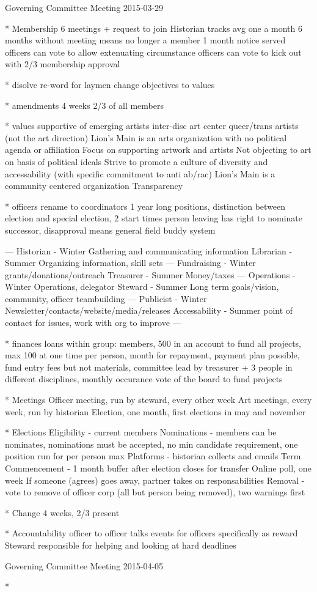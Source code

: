 Governing Committee Meeting 2015-03-29

* Membership
6 meetings + request to join
Historian tracks
avg one a month
6 months without meeting means no longer a member
1 month notice served
officers can vote to allow extenuating circumstance
officers can vote to kick out with 2/3 membership approval

* disolve
re-word for laymen
change objectives to values

* amendments
4 weeks
2/3 of all members

* values
supportive of emerging artists
inter-disc art
center queer/trans artists (not the art direction)
Lion's Main is an arts organization with no political agenda or affiliation
Focus on supporting artwork and artists
Not objecting to art on basis of political ideals
Strive to promote a culture of diversity and accessability (with specific commitment to anti ab/rac)
Lion's Main is a community centered organization
Transparency

* officers
rename to coordinators
1 year long positions, distinction between election and special election, 2 start times
person leaving has right to nominate successor, disapproval means general field
buddy system

---
Historian - Winter
  Gathering and communicating information
Librarian - Summer
  Organizing information, skill sets
---
Fundraising - Winter
  grants/donations/outreach
Treasurer - Summer
  Money/taxes
---
Operations - Winter
  Operations, delegator
Steward - Summer
  Long term goals/vision, community, officer teambuilding
---
Publicist - Winter
  Newsletter/contacts/website/media/releases
Accessability - Summer
  point of contact for issues, work with org to improve
---

* finances
loans within group: members, 500 in an account to fund all projects, max 100 at one time per person, month for repayment, payment plan possible, fund entry fees but not materials, committee lead by treasurer + 3 people in different disciplines, monthly occurance
vote of the board to fund projects

* Meetings
Officer meeting, run by steward, every other week
Art meetings, every week, run by historian
Election, one month, first elections in may and november

* Elections
Eligibility - current members
Nominations - members can be nominates, nominations must be accepted, no min candidate requirement, one position run for per person max
Platforms - historian collects and emails
Term Commencement - 1 month buffer after election closes for transfer
Online poll, one week
If someone (agrees) goes away, partner takes on responsabilities
Removal - vote to remove of officer corp (all but person being removed), two warnings first

* Change
4 weeks, 2/3 present

* Accountability
officer to officer talks
events for officers specifically as reward
Steward responsible for helping and looking at hard deadlines

Governing Committee Meeting 2015-04-05

* 

